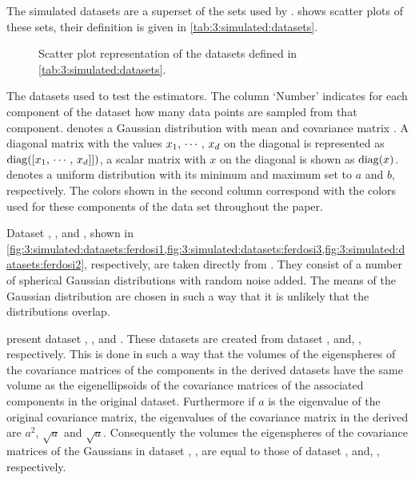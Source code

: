 
The simulated datasets are a superset of the sets used by \textcite{ferdosi2011comparison}.  shows scatter plots of these sets, their definition is given in \cref{tab:3:simulated:datasets}.

\begin{figure*}
	\centering
	
	\caption{Scatter plot representation of the datasets defined in \cref{tab:3:simulated:datasets}. }
	\label{fig:3:simulated:datasets}
\end{figure*}

\begin{table*}
	\centering
	
	\caption{The datasets used to test the estimators. The column `Number' indicates for each component of the dataset how many data points are sampled from that component. \gaussDist{\varMean}{\varCovarianceMatrix} denotes a Gaussian distribution with mean \varMean and covariance matrix \varCovarianceMatrix. A diagonal matrix with the values $x_1,\, \cdots,\, x_d$ on the diagonal is represented as $\operatorname{diag}([x_1,\,\cdots,\,x_d]])$, a scalar matrix with $x$ on the diagonal is shown as $\operatorname{diag}(x)$.  denotes a uniform distribution with its minimum and maximum set to $a$ and $b$, respectively. The colors shown in the second column correspond with the colors used for these components of the data set throughout the paper.} 	
	\label{tab:3:simulated:datasets}
\end{table*}

Dataset \ferdosiOne, \ferdosiTwo, and \ferdosiThreeNum, shown in \cref{fig:3:simulated:datasets:ferdosi1,fig:3:simulated:datasets:ferdosi3,fig:3:simulated:datasets:ferdosi2}, respectively, are taken directly from \textcite{ferdosi2011comparison}. They consist of a number of spherical Gaussian distributions with random noise added. The means of the Gaussian distribution are chosen in such a way that it is unlikely that the distributions overlap.

 present dataset \baakmanOne, \baakmanTwo, and \baakmanThree. These datasets are created from dataset \numberstringnum{\ferdosiOneNum}, \numberstringnum{\ferdosiTwoNum} and, \numberstringnum{\ferdosiThreeNum}, respectively. This is done in such a way that the volumes of the eigenspheres of the covariance matrices of the components in the derived datasets have the same volume as the eigenellipsoids of the covariance matrices of the associated components in the original dataset. Furthermore if $a$ is the eigenvalue of the original covariance matrix, the eigenvalues of the covariance matrix in the derived are $a^2$, $\sqrt{a}$ and $\sqrt{a}$. Consequently the volumes the eigenspheres of the covariance matrices of the Gaussians in dataset \numberstringnum{\baakmanOneNum}, \numberstringnum{\baakmanTwoNum}, \numberstringnum{\baakmanThreeNum} are equal to those of dataset \numberstringnum{\ferdosiOneNum},  \numberstringnum{\ferdosiOneNum} and, \numberstringnum{\ferdosiThreeNum}, respectively.

